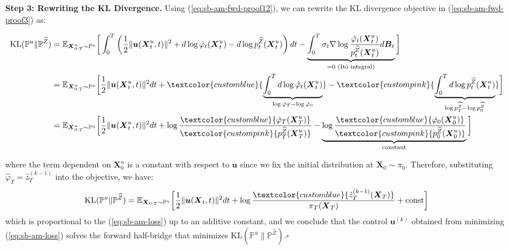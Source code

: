 \documentclass{article}
\newcommand{\bluetext}[1]{\textcolor{customblue}{#1}}
\newcommand{\pinktext}[1]{\textcolor{custompink}{#1}}
\begin{document}
\textbf{Step 3: Rewriting the KL Divergence. }
Using (\ref{eq:sb-am-fwd-proof12}), we can rewrite the KL divergence objective in (\ref{eq:sb-am-fwd-proof3}) as:
\begin{small}
\begin{align}
    \text{KL}(\mathbb{P}^u\|\mathbb{P}^{{\widehat{Z}}})&=\mathbb{E}_{\boldsymbol{X}^u_{0:T}\sim \mathbb{P}^u}\bigg[\int_0^T\left(\frac{1}{2}\|\boldsymbol{u}(\boldsymbol{X}^u_t,t)\|^2+d\log \hat\varphi_t(\boldsymbol{X}^u_t)- d\log p_t^{\widehat{Z}}(\boldsymbol{X}^u_t)\right)dt-\underbrace{\int_0^T\sigma_t\nabla \log \frac{\hat\varphi_t(\boldsymbol{X}^u_t)}{p_t^{\widehat{Z}}(\boldsymbol{X}^u_t)}d\boldsymbol{B}_t}_{=0\text{ (Itô integral)}}\bigg]\nonumber\\
    &=\mathbb{E}_{\boldsymbol{X}^u_{0:T}\sim \mathbb{P}^u}\bigg[\frac{1}{2}\|\boldsymbol{u}(\boldsymbol{X}^u_t,t)\|^2dt+\bluetext{\underbrace{\int_0^Td\log \hat\varphi_t(\boldsymbol{X}^u_t)}_{\log \hat\varphi_T-\log \hat\varphi_0}}- \pinktext{\underbrace{\int_0^Td\log p_t^{\widehat{Z}}(\boldsymbol{X}^u_t)}_{\log p^{\widehat{Z}}_T-\log p^{\widehat{Z}}_0}}\bigg]\nonumber\\
    &=\mathbb{E}_{\boldsymbol{X}^u_{0:T}\sim \mathbb{P}^u}\bigg[\frac{1}{2}\|\boldsymbol{u}(\boldsymbol{X}^u_t,t)\|^2dt+\log\frac{\bluetext{\hat\varphi_T(\boldsymbol{X}^u_T)}}{\pinktext{p_T^{\widehat{Z}}(\boldsymbol{X}^u_T)}}-\underbrace{\log\frac{\bluetext{\hat\varphi_0(\boldsymbol{X}^u_0)}}{\pinktext{p_0^{\widehat{Z}}(\boldsymbol{X}^u_0)}}}_{\text{constant}}\bigg]
\end{align}
\end{small}
where the term dependent on $\boldsymbol{X}^u_0$ is a constant with respect to $\boldsymbol{u}$ since we fix the initial distribution at $\boldsymbol{X}_0\sim \pi_0$. Therefore, substituting $\hat\varphi_T=\hat{z}_T^{(k-1)}$ into the objective, we have:
\begin{align}
    \text{KL}(\mathbb{P}^u\|\mathbb{P}^{\widehat{Z}})=\mathbb{E}_{\boldsymbol{X}_{0:T}\sim \mathbb{P}^u}\bigg[\frac{1}{2}\|\boldsymbol{u}(\boldsymbol{X}_t,t)\|^2dt+\log\frac{\bluetext{\hat{z}^{(k-1)}_T(\boldsymbol{X}_T)}}{\pi_T(\boldsymbol{X}_T)}+\text{const}\bigg]
\end{align}
which is proportional to the (\ref{eq:sb-am-loss}) up to an additive constant, and we conclude that the control $\boldsymbol{u}^{(k)}$ obtained from minimizing (\ref{eq:sb-am-loss}) solves the forward half-bridge that minimizes $\text{KL}(\mathbb{P}^u\|\mathbb{P}^{\widehat{Z}})$.\hfill $\square$
\end{document}
